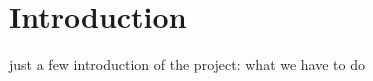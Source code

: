 \chapter{Introduction}
\label{cap:introduction}

just a few introduction of the project: what we have to do